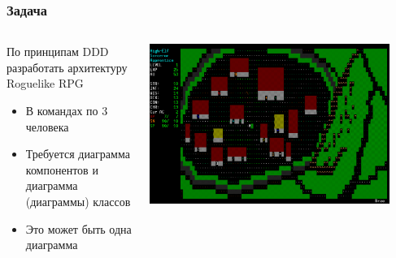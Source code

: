 \documentclass{../../slides-style}
\begin{document}
    \begin{frame}
        \frametitle{Задача}
        \begin{columns}
            \begin{column}{0.5\textwidth}
                По принципам DDD разработать архитектуру Roguelike RPG

                \begin{itemize}
                    \item В командах по 3 человека
                    \item Требуется диаграмма компонентов и диаграмма (диаграммы) классов
                    \item Это может быть одна диаграмма
                \end{itemize}
            \end{column}
            \begin{column}{0.5\textwidth}
                \begin{center}
                    \includegraphics[width=0.9\textwidth]{roguelike.png}
                \end{center}
            \end{column}
        \end{columns}
    \end{frame}
\end{document}
